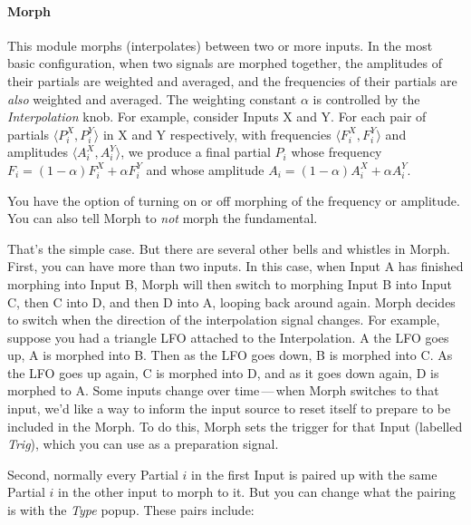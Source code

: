 \documentclass{article}
\begin{document}
\paragraph{Morph} This module morphs (interpolates) between two or more inputs.  In the most basic configuration, when two signals are morphed together, the amplitudes of their partials are weighted and averaged, and the frequencies of their partials are {\it also} weighted and averaged.  The weighting constant \(\alpha\) is controlled by the {\it Interpolation} knob.  For example, consider Inputs X and Y.  For each pair of partials \(\langle P^X_i, P^Y_i\rangle\) in X and Y respectively, with frequencies \(\langle F^X_i, F^Y_i\rangle\) and amplitudes \(\langle A^X_i, A^Y_i\rangle\), we produce a final partial \(P_i\) whose frequency \(F_i = (1-\alpha) F^X_i + \alpha F^Y_i\) and whose amplitude \(A_i = (1-\alpha) A^X_i + \alpha A^Y_i\).

You have the option of turning on or off morphing of the frequency or amplitude.  You can also tell Morph to {\it not} morph the fundamental.  

That's the simple case.  But there are several other bells and whistles in Morph.  First, you can have more than two inputs.  In this case, when Input A has finished morphing into Input B, Morph will then switch to morphing Input B into Input C, then C into D, and then D into A, looping back around again.  Morph decides to switch when the direction of the interpolation signal changes.  For example, suppose you had a triangle LFO attached to the Interpolation.  A the LFO goes up, A is morphed into B.  Then as the LFO goes down, B is morphed into C.  As the LFO goes up again, C is morphed into D, and as it goes down again, D is morphed to A.  Some inputs change over time\,---\,when Morph switches to that input, we'd like a way to inform the input source to reset itself to prepare to be included in the Morph.  To do this, Morph sets the trigger for that Input (labelled {\it Trig}), which you can use as a preparation signal.

Second, normally every Partial \(i\) in the first Input is paired up with the same Partial \(i\) in the other input to morph to it.  But you can change what the pairing is with the {\it Type} popup.  These pairs include:
\end{document}
